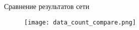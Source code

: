 
\begin{frame}{Сравнение результатов сети}
\begin{figure}
\centering
\texttt{[image: data\_count\_compare.png]}
\end{figure}
\end{frame}
